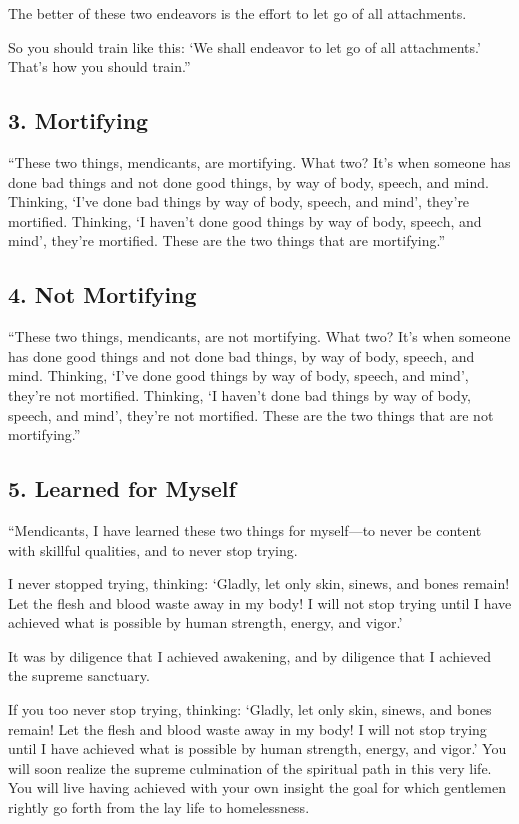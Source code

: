\documentclass[12pt,openany]{book}%
\begin{document}
The better of these two endeavors is the effort to let go of all attachments. 

So you should train like this: ‘We shall endeavor to let go of all attachments.’ That’s how you should train.” 

\subsection*{3. Mortifying }

“These two things, mendicants, are mortifying. What two? It’s when someone has done bad things and not done good things, by way of body, speech, and mind. Thinking, ‘I’ve done bad things by way of body, speech, and mind’, they’re mortified. Thinking, ‘I haven’t done good things by way of body, speech, and mind’, they’re mortified. These are the two things that are mortifying.” 

\subsection*{4. Not Mortifying }

“These two things, mendicants, are not mortifying. What two? It’s when someone has done good things and not done bad things, by way of body, speech, and mind. Thinking, ‘I’ve done good things by way of body, speech, and mind’, they’re not mortified. Thinking, ‘I haven’t done bad things by way of body, speech, and mind’, they’re not mortified. These are the two things that are not mortifying.” 

\subsection*{5. Learned for Myself }

“Mendicants, I have learned these two things for myself—to never be content with skillful qualities, and to never stop trying. 

I never stopped trying, thinking: ‘Gladly, let only skin, sinews, and bones remain! Let the flesh and blood waste away in my body! I will not stop trying until I have achieved what is possible by human strength, energy, and vigor.’ 

It was by diligence that I achieved awakening, and by diligence that I achieved the supreme sanctuary. 

If you too never stop trying, thinking: ‘Gladly, let only skin, sinews, and bones remain! Let the flesh and blood waste away in my body! I will not stop trying until I have achieved what is possible by human strength, energy, and vigor.’ You will soon realize the supreme culmination of the spiritual path in this very life. You will live having achieved with your own insight the goal for which gentlemen rightly go forth from the lay life to homelessness. 
\end{document}
